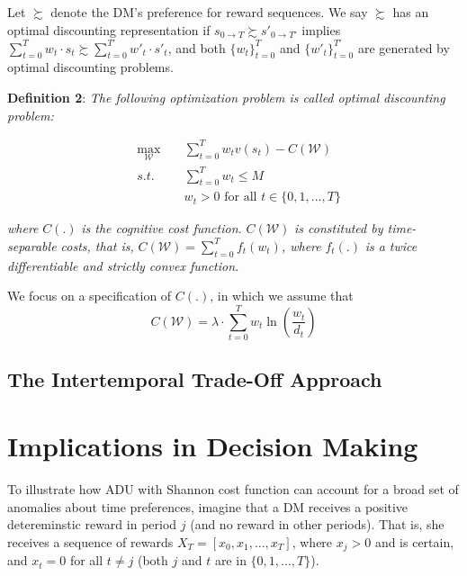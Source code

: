 \documentclass[
  12pt,
]{article}
\begin{document}
Let \(\succsim\) denote the DM's preference for reward sequences. We say
\(\succsim\) has an optimal discounting representation if
\(s_{0\rightarrow T} \succsim s'_{0\rightarrow T'}\) implies
\(\sum_{t=0}^T w_t\cdot s_t \succsim \sum_{t=0}^{T'} w'_t \cdot s'_t\),
and both \(\{w_t\}_{t=0}^T\) and \(\{w'_t\}^{T'}_{t=0}\) are generated
by optimal discounting problems.

\textbf{Definition 2}: \emph{The following optimization problem is
called optimal discounting problem:}

\[
\begin{aligned}
&\max_{\mathcal{W}}\;&&\sum_{t=0}^T w_tv(s_t) - C(\mathcal{W}) \\
&s.t.\; &&\sum_{t=0}^Tw_t \leq M \\
&&& w_t >0 \text{ for all } t\in \{0,1,...,T\}
\end{aligned}
\]

\emph{where} \(C(.)\) \emph{is the cognitive cost function.}
\(C(\mathcal{W})\) \emph{is constituted by time-separable costs, that
is,} \(C(\mathcal{W})=\sum_{t=0}^Tf_t(w_t)\)\emph{, where} \(f_t(.)\)
\emph{is a twice differentiable and strictly convex function.}

We focus on a specification of \(C(.)\), in which we assume that\[
C(\mathcal{W})= \lambda\cdot\sum_{t=0}^T w_t
\ln\left(\frac{w_t}{d_t}\right)
\]

\hypertarget{the-intertemporal-trade-off-approach}{%
\subsection{The Intertemporal Trade-Off
Approach}\label{the-intertemporal-trade-off-approach}}

\hypertarget{implications-in-decision-making}{%
\section{\texorpdfstring{Implications in Decision Making
\label{behavioral}}{Implications in Decision Making }}\label{implications-in-decision-making}}

To illustrate how ADU with Shannon cost function can account for a broad
set of anomalies about time preferences, imagine that a DM receives a
positive detereminstic reward in period \(j\) (and no reward in other
periods). That is, she receives a sequence of rewards
\(X_T=[x_0,x_1,…,x_T]\), where \(x_j>0\) and is certain, and \(x_t = 0\)
for all \(t \neq j\) (both \(j\) and \(t\) are in \(\{0,1,...,T\}\)).
\end{document}

